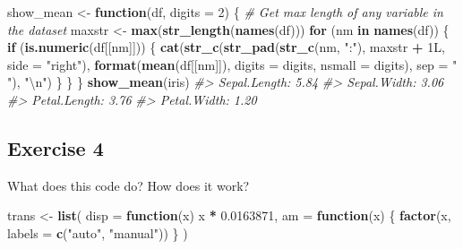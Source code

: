 \documentclass[]{book}
\newenvironment{Shaded}{\begin{snugshade}}{\end{snugshade}}
\newcommand{\CharTok}[1]{\textcolor[rgb]{0.31,0.60,0.02}{#1}}
\newcommand{\CommentTok}[1]{\textcolor[rgb]{0.56,0.35,0.01}{\textit{#1}}}
\newcommand{\ControlFlowTok}[1]{\textcolor[rgb]{0.13,0.29,0.53}{\textbf{#1}}}
\newcommand{\DataTypeTok}[1]{\textcolor[rgb]{0.13,0.29,0.53}{#1}}
\newcommand{\DecValTok}[1]{\textcolor[rgb]{0.00,0.00,0.81}{#1}}
\newcommand{\FloatTok}[1]{\textcolor[rgb]{0.00,0.00,0.81}{#1}}
\newcommand{\KeywordTok}[1]{\textcolor[rgb]{0.13,0.29,0.53}{\textbf{#1}}}
\newcommand{\NormalTok}[1]{#1}
\newcommand{\OperatorTok}[1]{\textcolor[rgb]{0.81,0.36,0.00}{\textbf{#1}}}
\newcommand{\StringTok}[1]{\textcolor[rgb]{0.31,0.60,0.02}{#1}}
\theoremstyle{plain}
\theoremstyle{remark}
\theoremstyle{definition}
\theoremstyle{definition}
\theoremstyle{definition}
\theoremstyle{remark}
\begin{document}
\begin{Shaded}
\begin{Highlighting}[]
\NormalTok{show_mean <-}\StringTok{ }\ControlFlowTok{function}\NormalTok{(df, }\DataTypeTok{digits =} \DecValTok{2}\NormalTok{) \{}
  \CommentTok{# Get max length of any variable in the dataset}
\NormalTok{  maxstr <-}\StringTok{ }\KeywordTok{max}\NormalTok{(}\KeywordTok{str_length}\NormalTok{(}\KeywordTok{names}\NormalTok{(df)))}
  \ControlFlowTok{for}\NormalTok{ (nm }\ControlFlowTok{in} \KeywordTok{names}\NormalTok{(df)) \{}
    \ControlFlowTok{if}\NormalTok{ (}\KeywordTok{is.numeric}\NormalTok{(df[[nm]])) \{}
      \KeywordTok{cat}\NormalTok{(}\KeywordTok{str_c}\NormalTok{(}\KeywordTok{str_pad}\NormalTok{(}\KeywordTok{str_c}\NormalTok{(nm, }\StringTok{":"}\NormalTok{), maxstr }\OperatorTok{+}\StringTok{ }\NormalTok{1L, }\DataTypeTok{side =} \StringTok{"right"}\NormalTok{),}
                \KeywordTok{format}\NormalTok{(}\KeywordTok{mean}\NormalTok{(df[[nm]]), }\DataTypeTok{digits =}\NormalTok{ digits, }\DataTypeTok{nsmall =}\NormalTok{ digits),}
                \DataTypeTok{sep =} \StringTok{" "}\NormalTok{),}
          \StringTok{"}\CharTok{\textbackslash{}n}\StringTok{"}\NormalTok{)}
\NormalTok{    \}}
\NormalTok{  \}}
\NormalTok{\}}
\KeywordTok{show_mean}\NormalTok{(iris)}
\CommentTok{#> Sepal.Length: 5.84 }
\CommentTok{#> Sepal.Width:  3.06 }
\CommentTok{#> Petal.Length: 3.76 }
\CommentTok{#> Petal.Width:  1.20}
\end{Highlighting}
\end{Shaded}

\hypertarget{exercise-4-33}{%
\subsection{Exercise 4}\label{exercise-4-33}}

What does this code do? How does it work?

\begin{Shaded}
\begin{Highlighting}[]
\NormalTok{trans <-}\StringTok{ }\KeywordTok{list}\NormalTok{(}
  \DataTypeTok{disp =} \ControlFlowTok{function}\NormalTok{(x) x }\OperatorTok{*}\StringTok{ }\FloatTok{0.0163871}\NormalTok{,}
  \DataTypeTok{am =} \ControlFlowTok{function}\NormalTok{(x) \{}
    \KeywordTok{factor}\NormalTok{(x, }\DataTypeTok{labels =} \KeywordTok{c}\NormalTok{(}\StringTok{"auto"}\NormalTok{, }\StringTok{"manual"}\NormalTok{))}
\NormalTok{  \}}
\NormalTok{)}
\end{Highlighting}
\end{Shaded}
\end{document}
